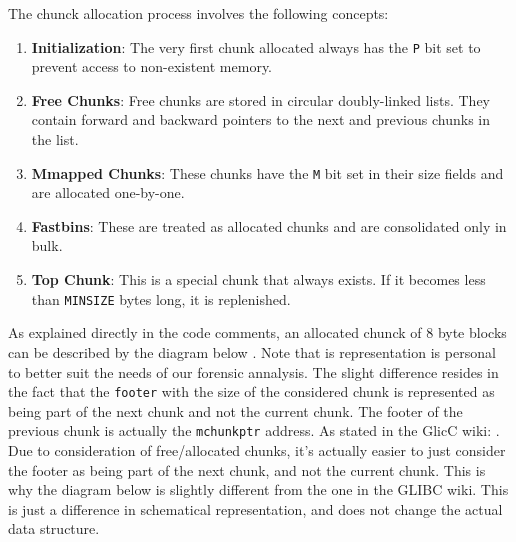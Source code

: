     The chunck allocation process involves the following concepts: 

    \begin{enumerate}
        \item \textbf{Initialization}: The very first chunk allocated always has the \texttt{P} bit set to prevent access to non-existent memory.
        
        \item \textbf{Free Chunks}: Free chunks are stored in circular doubly-linked lists. They contain forward and backward pointers to the next and previous chunks in the list.
        
        \item \textbf{Mmapped Chunks}: These chunks have the \texttt{M} bit set in their size fields and are allocated one-by-one.
        
        \item \textbf{Fastbins}: These are treated as allocated chunks and are consolidated only in bulk.
        
        \item \textbf{Top Chunk}: This is a special chunk that always exists. If it becomes less than \texttt{MINSIZE} bytes long, it is replenished.
    \end{enumerate}

    As explained directly in the code comments, an allocated chunck of 8 byte blocks can be described by the diagram below \cite{MallocGLIBC2001}. Note that is representation is personal to better suit the needs of our forensic annalysis. The slight difference resides in the fact that the \texttt{footer} with the size of the considered chunk is represented as being part of the next chunk and not the current chunk. The footer of the previous chunk is actually the \texttt{mchunkptr} address. As stated in the GlicC wiki:  \cite{MallocInternalsWiki2023}. Due to consideration of free/allocated chunks, it's actually easier to just consider the footer as being part of the next chunk, and not the current chunk. This is why the diagram below is slightly different from the one in the GLIBC wiki. This is just a difference in schematical representation, and does not change the actual data structure.

